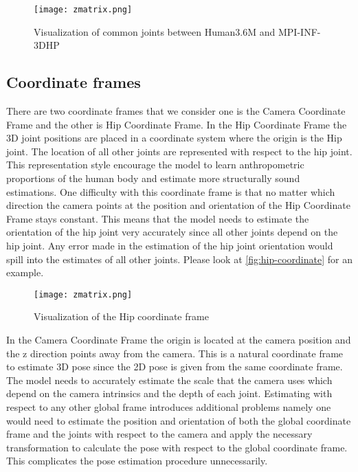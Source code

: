 \begin{figure}[htpb]
    \texttt{[image: zmatrix.png]}
    \caption{Visualization of common joints between Human3.6M and MPI-INF-3DHP}
    \label{fig:joint-map}
\end{figure}

\subsection{Coordinate frames}

There are two coordinate frames that we consider one is the Camera Coordinate Frame and the other is Hip Coordinate Frame. In the Hip Coordinate Frame the 3D joint positions are placed in a coordinate system where the origin is the Hip joint. The location of all other joints are represented with respect to the hip joint. This representation style encourage the model to learn anthropometric proportions of the human body and estimate more structurally sound estimations. One difficulty with this coordinate frame is that no matter which direction the camera points at the position and orientation of the Hip Coordinate Frame stays constant. This means that the model needs to estimate the orientation of the hip joint very accurately since all other joints depend on the hip joint. Any error made in the estimation of the hip joint orientation would spill into the estimates of all other joints. Please look at \autoref{fig:hip-coordinate} for an example.

\begin{figure}[htpb]
    \texttt{[image: zmatrix.png]}
    \caption{Visualization of the Hip coordinate frame}
    \label{fig:hip-coordinate}
\end{figure}

In the Camera Coordinate Frame the origin is located at the camera position and the z direction points away from the camera. This is a natural coordinate frame to estimate 3D pose since the 2D pose is given from the same coordinate frame. The model needs to accurately estimate the scale that the camera uses which depend on the camera intrinsics and the depth of each joint. Estimating with respect to any other global frame introduces additional problems namely one would need to estimate the position and orientation of both the global coordinate frame and the joints with respect to the camera and apply the necessary transformation to calculate the pose with respect to the global coordinate frame. This complicates the pose estimation procedure unnecessarily.


